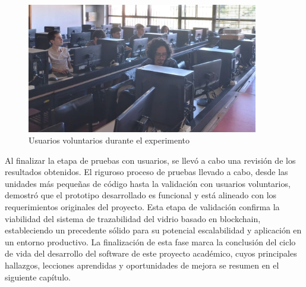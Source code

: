 \begin{figure}[!htb]
\centering
\includegraphics[width=0.9\textwidth]{Figures/uat-2.jpg}
\caption{Usuarios voluntarios durante el experimento}
\label{fig:uat-picture-2}
\end{figure}

Al finalizar la etapa de pruebas con usuarios, se llevó a cabo una revisión de los resultados obtenidos. El riguroso proceso de pruebas llevado a cabo, desde las unidades más pequeñas de código hasta la validación con usuarios voluntarios, demostró que el prototipo desarrollado es funcional y está alineado con los requerimientos originales del proyecto. Esta etapa de validación confirma la viabilidad del sistema de trazabilidad del vidrio basado en blockchain, estableciendo un precedente sólido para su potencial escalabilidad y aplicación en un entorno productivo. La finalización de esta fase marca la conclusión del ciclo de vida del desarrollo del software de este proyecto académico, cuyos principales hallazgos, lecciones aprendidas y oportunidades de mejora se resumen en el siguiente capítulo.
